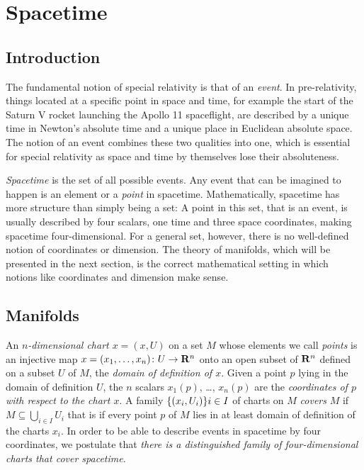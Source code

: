 \chapter{Spacetime}

\section{Introduction}

The fundamental notion of special relativity is that of an \emph{event}.
In pre-relativity, things located at a specific point in space and time,
for example the start of the Saturn V rocket launching the Apollo 11
spaceflight, are described by a unique time in Newton's absolute time and
a unique place in Euclidean absolute space. The notion of an event combines
these two qualities into one, which is essential for special relativity
as space and time by themselves lose their absoluteness.

\emph{Spacetime} is the set of all possible events. Any event that can
be imagined to happen is an element or a
\emph{point} in spacetime. Mathematically, spacetime has more
structure than simply being a set: A point in this set, that is an event, is
usually described by four scalars, one time and three space coordinates,
making spacetime four-dimensional. For a general set, however, there is no
well-defined notion of coordinates or dimension. The theory of manifolds, which
will be presented in the next section, is the correct mathematical setting in
which notions like coordinates and dimension make sense.

\section{Manifolds}
\label{sec:manifolds}

An \emph{$n$-dimensional chart $x = (x, U)$} on a set $M$ whose elements we call
\emph{points} is an injective map
$x = (x_1, \dotsc, x_n)\colon U \to \mathbf{R}^n$ onto an open subset of $\mathbf{R}^n$ defined on a subset
$U$ of $M$, the \emph{domain of definition of $x$}. Given a point $p$ lying in the
domain of definition $U$, the $n$ scalars $x_1(p)$, \dots, $x_n(p)$ are the
\emph{coordinates of $p$ with respect to the chart $x$}. A
family $\lbrace(x_i, U_i)\rbrace{i \in I}$ of charts on $M$ \emph{covers} $M$ if $M \subseteq
\bigcup_{i \in I} U_i$ that is if every point $p$ of $M$ lies in at least domain
of definition of the charts $x_i$. In order to be able to describe events in
spacetime by four coordinates, we postulate that \emph{there is a distinguished
family of four-dimensional charts that cover spacetime}.

